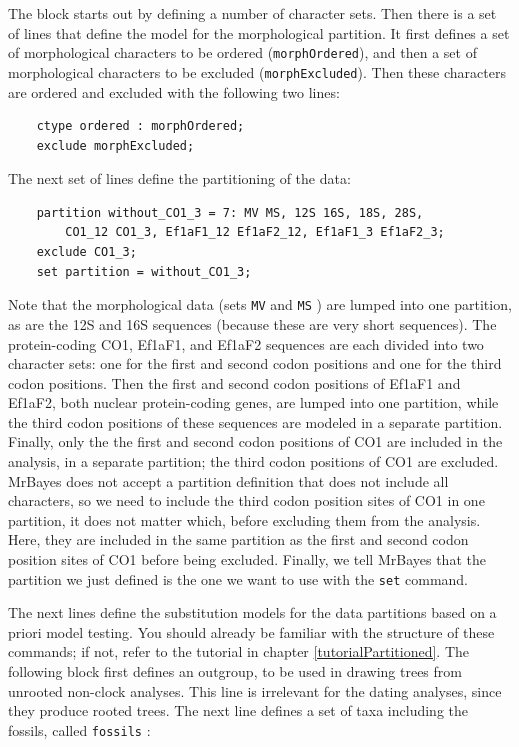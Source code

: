\documentclass[12pt]{book}
\newcommand{\ttt}[1]{\texttt{#1} }
\begin{document}
The block starts out by defining a number of character sets. Then there is a set of lines that define the
model for the morphological partition. It first defines a set of morphological characters to be ordered
(\texttt{morphOrdered}), and then a set of morphological characters to be excluded (\texttt{morphExcluded}).
Then these characters are ordered and excluded with the following two lines:

\begin{singlespacing}
\begin{verbatim}
    ctype ordered : morphOrdered;
    exclude morphExcluded;
\end{verbatim}
\end{singlespacing}

The next set of lines define the partitioning of the data:

\begin{singlespacing}
\begin{verbatim}
    partition without_CO1_3 = 7: MV MS, 12S 16S, 18S, 28S,
        CO1_12 CO1_3, Ef1aF1_12 Ef1aF2_12, Ef1aF1_3 Ef1aF2_3;
    exclude CO1_3;
    set partition = without_CO1_3;
\end{verbatim}
\end{singlespacing}

Note that the morphological data (sets \ttt{MV} and \ttt{MS}) are lumped into one partition, as are the 12S and
16S sequences (because these are very short sequences). The protein-coding CO1, Ef1aF1, and Ef1aF2
sequences are each divided into two character sets: one for the first and second codon positions and one for
the third codon positions. Then the first and second codon positions of Ef1aF1 and Ef1aF2, both nuclear
protein-coding genes, are lumped into one partition, while the third codon positions of these sequences are
modeled in a separate partition. Finally, only the the first and second codon positions of CO1 are included in
the analysis, in a separate partition; the third codon positions of CO1 are excluded. MrBayes does not accept
a partition definition that does not include all characters, so we need to include the third codon position sites of
CO1 in one partition, it does not matter which, before excluding them from the analysis. Here, they are
included in the same partition as the first and second codon position sites of CO1 before being excluded.
Finally, we tell MrBayes that the partition we just defined is the one we want to use with the \ttt{set} command.

The next lines define the substitution models for the data partitions based on a priori model testing. You should
already be familiar with the structure of these commands; if not, refer to the tutorial in chapter \ref{tutorialPartitioned}.
The following block first defines an outgroup, to be used in drawing trees from unrooted non-clock analyses. This
line is irrelevant for the dating analyses, since they produce rooted trees. The next line defines a set of taxa
including the fossils, called \ttt{fossils}:
\end{document}
